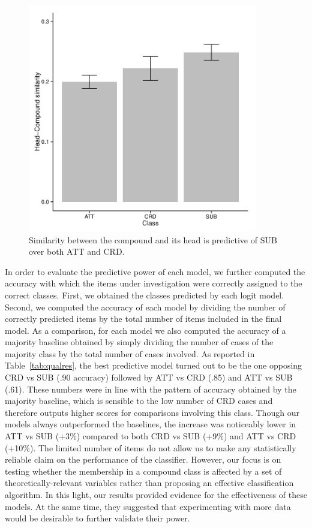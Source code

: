 \documentclass[output=paper]{langsci/langscibook}
\begin{document}
\begin{figure}[t!]
\begin{center}
\includegraphics[width=10cm]{figures/barplot2.pdf}
\caption{Similarity between the compound and its head is predictive of SUB over both ATT and CRD.}\label{fig:bar2}
\end{center}
\end{figure}


In order to evaluate the predictive power of each model, we further computed the accuracy with which the items under investigation were correctly assigned to the correct classes. First, we obtained the classes predicted by each logit model. Second, we computed the accuracy of each model by dividing the number of correctly predicted items by the total number of items included in the final model. As a comparison, for each model we also computed the accuracy of a majority baseline obtained by simply dividing the number of cases of the majority class by the total number of cases involved.  As reported in Table~\ref{tab:qualres}, the best predictive model turned out to be the one opposing CRD vs SUB (.90 accuracy) followed by ATT vs CRD (.85) and ATT vs SUB (.61). These numbers were in line with the pattern of accuracy obtained by the majority baseline, which is sensible to the low number of CRD cases and therefore outputs higher scores for comparisons involving this class. Though our models always outperformed the baselines, the increase was noticeably lower in ATT vs SUB (+3\%) compared to both CRD vs SUB (+9\%) and ATT vs CRD (+10\%). The limited number of items do not allow us to make any statistically reliable claim on the performance of the classifier. However, our focus is on testing whether the membership in a compound class is affected by a set of theoretically-relevant variables rather than proposing an effective classification algorithm. In this light, our results provided evidence for the effectiveness of these models. At the same time, they suggested that experimenting with more data would be desirable to further validate their power.
\end{document}
